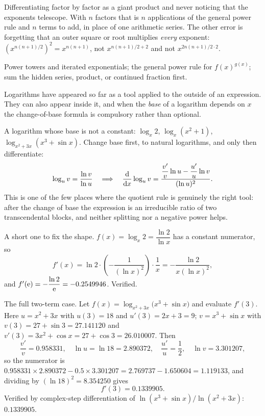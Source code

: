 \begin{trap}
Differentiating factor by factor as a giant product and never noticing that the exponents telescope. With $n$ factors that is $n$ applications of the general power rule and $n$ terms to add, in place of one arithmetic series. The other error is forgetting that an outer square or root multiplies \emph{every} exponent: $\left(x^{n(n+1)/2}\right)^{2}=x^{n(n+1)}$, not $x^{n(n+1)/2+2}$ and not $x^{2n(n+1)/2\cdot 2}$.
\end{trap}

\begin{seealsob}Power towers and iterated exponentials; the general power rule for $f(x)^{g(x)}$; sum the hidden series, product, or continued fraction first.\end{seealsob}

Logarithms have appeared so far as a tool applied to the outside of an expression. They can also appear inside it, and when the \emph{base} of a logarithm depends on $x$ the change-of-base formula is compulsory rather than optional.

\cue A logarithm whose base is not a constant: $\log_{x}2$, $\log_{x}(x^{2}+1)$, $\log_{x^{2}+3x}(x^{3}+\sin x)$.
\method Change base first, to natural logarithms, and only then differentiate:
\[
\log_{u}v=\frac{\ln v}{\ln u}\quad\Longrightarrow\quad
\frac{\mathrm{d}}{\mathrm{d}x}\log_{u}v=\frac{\dfrac{v'}{v}\ln u-\dfrac{u'}{u}\ln v}{(\ln u)^{2}} .
\]
This is one of the few places where the quotient rule is genuinely the right tool: after the change of base the expression is an irreducible ratio of two transcendental blocks, and neither splitting nor a negative power helps.

\begin{worked}
A short one to fix the shape. $f(x)=\log_{x}2=\dfrac{\ln2}{\ln x}$ has a constant numerator, so
\[
f'(x)=\ln2\cdot\left(-\frac{1}{(\ln x)^{2}}\right)\cdot\frac1x=-\frac{\ln2}{x(\ln x)^{2}},
\]
and $f'(\mathrm{e})=-\dfrac{\ln2}{\mathrm{e}}=-0.2549946$. Verified.

The full two-term case. Let $f(x)=\log_{x^{2}+3x}\bigl(x^{3}+\sin x\bigr)$ and evaluate $f'(3)$. Here $u=x^{2}+3x$ with $u(3)=18$ and $u'(3)=2x+3=9$; $v=x^{3}+\sin x$ with $v(3)=27+\sin3=27.141120$ and $v'(3)=3x^{2}+\cos x=27+\cos3=26.010007$. Then
\[
\frac{v'}{v}=0.958331,\quad \ln u=\ln18=2.890372,\quad \frac{u'}{u}=\frac12,\quad \ln v=3.301207,
\]
so the numerator is $0.958331\times2.890372-0.5\times3.301207=2.769737-1.650604=1.119133$, and dividing by $(\ln18)^{2}=8.354250$ gives
\[
f'(3)=0.1339905 .
\]
Verified by complex-step differentiation of $\ln(x^{3}+\sin x)/\ln(x^{2}+3x)$: $0.1339905$.
\end{worked}

